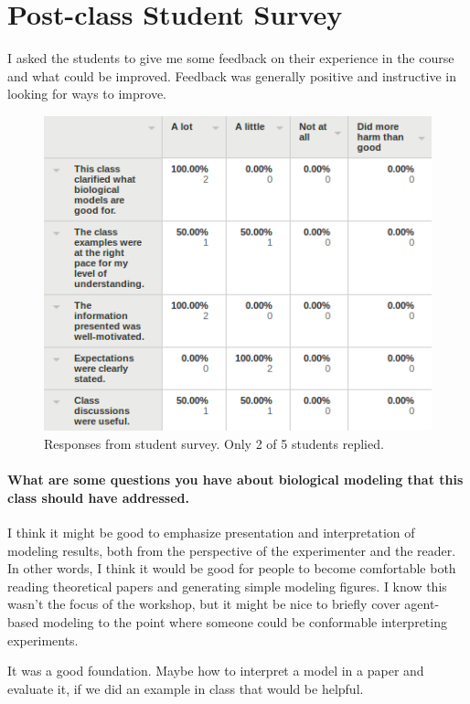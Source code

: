 \section{Post-class Student Survey}

I asked the students to give me some feedback on their experience in the course and what could be improved.  Feedback was generally positive and instructive in looking for ways to improve.

\begin{figure}[h!]
	\centering
	\includegraphics[width=0.8\hsize]{workshop/table_of_responses.png}
	\caption{Responses from student survey.  Only 2 of 5 students replied.} 
	
\end{figure}

\paragraph{What are some questions you have about biological modeling that this class should have addressed.}

I think it might be good to emphasize presentation and interpretation of modeling results, both from the perspective of the experimenter and the reader. In other words, I think it would be good for people to become comfortable both reading theoretical papers and generating simple modeling figures. I know this wasn't the focus of the workshop, but it might be nice to briefly cover agent-based modeling to the point where someone could be conformable interpreting experiments. 

It was a good foundation. Maybe how to interpret a model in a paper and evaluate it, if we did an example in class that would be helpful. 


